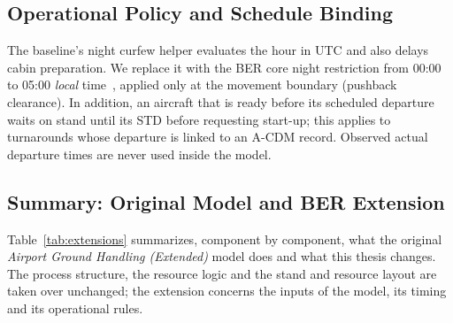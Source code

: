 \subsection{Operational Policy and Schedule Binding}
The baseline's night curfew helper evaluates the hour in UTC and also delays cabin preparation. We replace it with the BER core night restriction from 00:00 to 05:00 \emph{local} time~\cite{ber_night}, applied only at the movement boundary (pushback clearance). In addition, an aircraft that is ready before its scheduled departure waits on stand until its STD before requesting start-up; this applies to turnarounds whose departure is linked to an A-CDM record. Observed actual departure times are never used inside the model.

\subsection{Summary: Original Model and BER Extension}
\label{sec:method-extsummary}
Table~\ref{tab:extensions} summarizes, component by component, what the original \emph{Airport Ground Handling (Extended)} model does and what this thesis changes. The process structure, the resource logic and the stand and resource layout are taken over unchanged; the extension concerns the inputs of the model, its timing and its operational rules.

